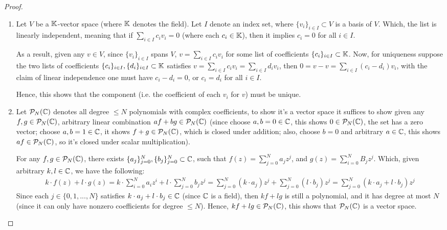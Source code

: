 \documentclass{article}
\begin{document}
\begin{proof}
    
    \hfil
    
    \begin{enumerate}
        \item Let $V$ be a $\mathbb{K}$-vector space (where $\mathbb{K}$ denotes the field). Let $I$ denote an index set, where $\{v_i\}_{i\in I} \subset V$ is a basis of $V$. Which, the list is linearly independent, meaning that if $\sum_{i\in I}c_i v_i=0$ (where each $c_i\in \mathbb{K}$), then it implies $c_i=0$ for all $i\in I$.
        
        As a result, given any $v\in V$, since $\{v_i\}_{i\in I}$ spans $V$, $v=\sum_{i\in I}c_i v_i$ for some list of coefficients $\{c_i\}_{i\in I} \subset \mathbb{K}$. Now, for uniqueness suppose the two lists of coefficients $\{c_i\}_{i\in I}, \{d_i\}_{i\in I} \subset \mathbb{K}$ satisfies $v = \sum_{i\in I}c_i v_i = \sum_{i\in I}d_i v_i$, then $0=v-v = \sum_{i\in I}(c_i-d_i)v_i$, with the claim of linear independence one must have $c_i-d_i=0$, or $c_i=d_i$ for all $i\in I$.

        Hence, this shows that the component (i.e. the coefficient of each $v_i$ for $v$) must be unique.

        \vspace{0.5em}

        \item Let $\mathcal{P}_N(\mathbb{C})$ denotes all degree $\leq N$ polynomials with complex coefficients, to show it's a vector space it suffices to show given any $f,g \in \mathcal{P}_N(\mathbb{C})$, arbitrary linear combination $af+bg \in \mathcal{P}_N(\mathbb{C})$ (since choose $a,b=0\in\mathbb{C}$, this shows $0\in\mathcal{P}_N(\mathbb{C})$, the set has a zero vector; choose $a,b=1\in\mathbb{C}$, it shows $f+g\in\mathcal{P}_N(\mathbb{C})$, which is closed under addition; also, choose $b=0$ and arbitrary $a\in\mathbb{C}$, this shows $af\in\mathcal{P}_N(\mathbb{C})$, so it's closed under scalar multiplication).
        
        For any $f,g\in\mathcal{P}_N(\mathbb{C})$, there exists $\{a_j\}_{j=0}^N,\{b_j\}_{j=0}^N\subset \mathbb{C}$, such that $f(z) = \sum_{j=0}^N a_j z^j$, and $g(z)=\sum_{i=0}^N B_j z^j$. Which, given arbitrary $k,l \in\mathbb{C}$, we have the following:
        \begin{align}
            k\cdot f(z)+l\cdot g(z)=k\cdot\sum_{i=0}^{N}a_i z^i+l\cdot \sum_{j=0}^{N}b_j z^j = \sum_{j=0}^{N}(k\cdot a_j)z^j + \sum_{j=0}^{N}(l\cdot b_j)z^j = \sum_{j=0}^{N}(k\cdot a_j+l\cdot b_j)z^j
        \end{align}
        Since each $j\in\{0,1,...,N\}$ satisfies $k\cdot a_j+l\cdot b_j \in\mathbb{C}$ (since $\mathbb{C}$ is a field), then $kf+lg$ is still a polynomial, and it has degree at most $N$ (since it can only have nonzero coefficients for degree $\leq N$). Hence, $kf+lg \in\mathcal{P}_N(\mathbb{C})$, this shows that $\mathcal{P}_N(\mathbb{C})$ is a vector space.


\end{enumerate}
\end{proof}
\end{document}
